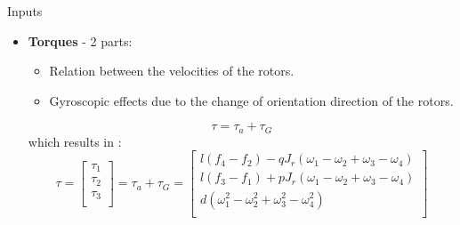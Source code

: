 \documentclass{thesisbeamer}
\begin{document}
\begin{frame}[t]{Inputs} \vspace{4pt}
\begin{itemize}
	\item \textbf{Torques} - 2 parts:
	\begin{itemize}
		\item Relation between the velocities of the rotors.
		\item Gyroscopic effects due to the change of orientation direction of the rotors.
	\end{itemize}
	
\begin{equation}
	\tau = \tau_a + \tau_G
\end{equation}
which results in \cite{Fantoni2016}:
\begin{equation}\label{total_torque_equation}
\tau = \begin{bmatrix}
\tau_1\\
\tau_2\\
\tau_3\\
\end{bmatrix} = \tau_a + \tau_G = \begin{bmatrix}
l(f_4-f_2) - qJ_r(\omega_1-\omega_2+\omega_3-\omega_4)\\
l(f_3-f_1) + pJ_r(\omega_1-\omega_2+\omega_3-\omega_4)\\
d(\omega_1^2-\omega_2^2+\omega_3^2-\omega_4^2)\\
\end{bmatrix}
\end{equation}
\end{itemize}
\end{frame}
\end{document}
